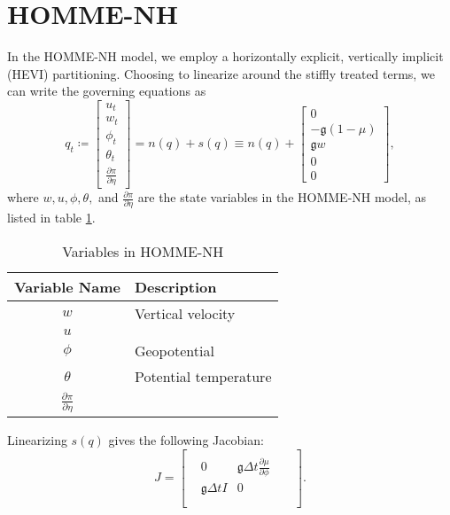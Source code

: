 \documentclass{csri19}
\newcommand{\CFKg}{\mathfrak{g}}
\begin{document}
\section{HOMME-NH}\label{CFK:sec:homme}
In the HOMME-NH model, we employ a horizontally explicit, vertically implicit (HEVI) partitioning. Choosing to linearize around the stiffly treated terms, we can write the governing equations as
\[q_t \coloneqq \begin{bmatrix} u_t \\
w_t\\
\phi_t\\
\theta_t\\
\frac{\partial \pi}{\partial \eta}
\end{bmatrix} = n(q) + s(q) \equiv n(q) + \begin{bmatrix}
0\\
-\CFKg (1-\mu)\\
\CFKg w\\
0\\
0\end{bmatrix},\] where $w, u,\phi, \theta,$ and $\frac{\partial \pi}{\partial \eta}$ are the state variables in the HOMME-NH model, as listed in table \ref{CFK:tab:variables}.

\begin{table}
  \caption{Variables in HOMME-NH}
  \label{CFK:tab:variables}
  \begin{center}
    \begin{tabular}{|c|l|}
      \hline
      \textbf{Variable Name} & \textbf{Description} \\
      \hline
      $w$ & Vertical velocity \\
      $u$ & \\
      $\phi$ & Geopotential \\
      $\theta$ & Potential temperature \\
      $\frac{\partial\pi}{\partial\eta}$ & \\
      \hline 
    \end{tabular}
  \end{center}
\end{table}

Linearizing $s(q)$ gives the following Jacobian:
\[ J = \begin{bmatrix}
 &                  &                                                   &  & \\
 & 0                & \CFKg \Delta t \frac{\partial \mu}{\partial \phi} &  & \\
 & \CFKg \Delta t I & 0                                                 &  & \\
 &                  &                                                   &  & \\
 &                  &                                                   &  & \end{bmatrix}.\]
\end{document}

